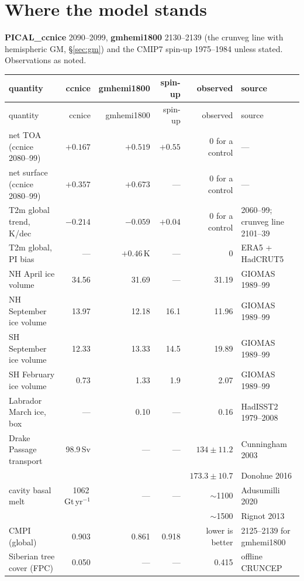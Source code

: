 \documentclass[10pt]{article}
\begin{document}
\section{Where the model stands}\label{sec:stands}

\textbf{PICAL\_ccnice} 2090--2099, \textbf{gmhemi1800} 2130--2139 (the crunveg line with
hemispheric GM, \S\ref{sec:gm}) and the CMIP7 spin-up 1975--1984 unless stated. Observations as
noted.

{\small
\begin{longtable}{lrrrrl}
\toprule
quantity & ccnice & gmhemi1800 & spin-up & observed & source \\
\midrule
\endfirsthead
\toprule
quantity & ccnice & gmhemi1800 & spin-up & observed & source \\
\midrule
\endhead
net TOA (ccnice 2080--99)     & $+0.167$ & $+0.519$ & $+0.55$ & 0 for a control & --- \\
net surface (ccnice 2080--99) & $+0.357$ & $+0.673$ & --- & 0 for a control & --- \\
T2m global trend, K/dec       & $-0.214$ & $-0.059$ & $+0.04$ & 0 for a control & 2060--99; crunveg line 2101--39 \\
T2m global, PI bias           & ---      & $+0.46$\,K & --- & 0 & ERA5 + HadCRUT5 \\
NH April ice volume           & 34.56 & 31.69 & --- & 31.19 & GIOMAS 1989--99 \\
NH September ice volume       & 13.97 & 12.18 & 16.1 & 11.96 & GIOMAS 1989--99 \\
SH September ice volume       & 12.33 & 13.33 & 14.5 & 19.89 & GIOMAS 1989--99 \\
SH February ice volume        & 0.73  & 1.33  & 1.9 & 2.07  & GIOMAS 1989--99 \\
Labrador March ice, box       & ---   & 0.10  & --- & 0.16  & HadISST2 1979--2008 \\
Drake Passage transport       & 98.9\,Sv & --- & --- & $134\pm11.2$ & Cunningham 2003 \\
                              &          &     & & $173.3\pm10.7$ & Donohue 2016 \\
cavity basal melt             & 1062\,Gt\,yr$^{-1}$ & --- & --- & $\sim$1100 & Adusumilli 2020 \\
                              &                     &     & & $\sim$1500 & Rignot 2013 \\
CMPI (global)                 & 0.903 & 0.861 & 0.918 & lower is better & 2125--2139 for gmhemi1800 \\
Siberian tree cover (FPC)     & 0.050 & ---   & --- & 0.415 & offline CRUNCEP \\
\bottomrule
\end{longtable}}
\end{document}
